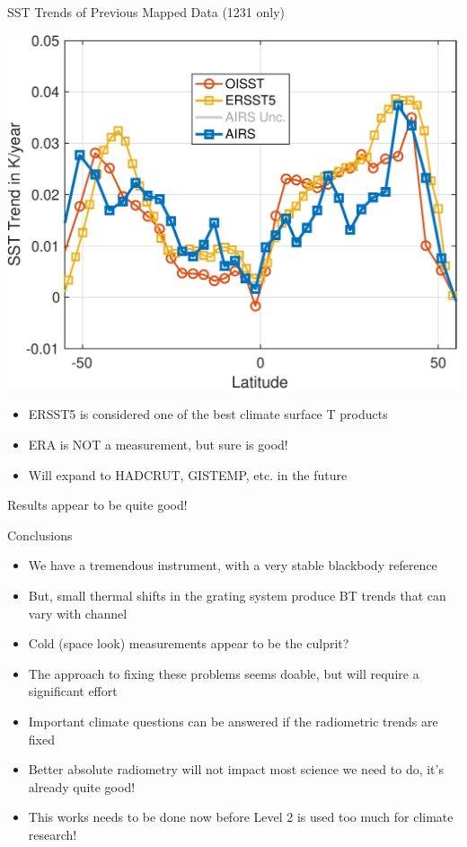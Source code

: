 \documentclass[10pt,t]{beamer}
\begin{document}
\begin{frame}[label={sec:orgf1f02b5}]{SST Trends of Previous Mapped Data (1231 \wn only)}
\begin{center}
\includegraphics[width=0.7\linewidth]{./Figs/Pdf/zonal_sst_trends_12311_vs_oisst_ersst5_hottest_per_grid_envelope.pdf}
\end{center}

\begin{footnotesize}
\begin{itemize}
\item ERSST5 is considered one of the best climate surface T products
\item ERA is NOT a measurement, but sure is good!
\item Will expand to HADCRUT, GISTEMP, etc. in the future
\end{itemize}

Results appear to be quite good! 
\end{footnotesize}
\end{frame}

\begin{frame}[label={sec:org65773c4}]{Conclusions}
\begin{itemize}
\item We have a tremendous instrument, with a very stable blackbody reference
\item But, small thermal shifts in the grating system produce BT trends that can vary with channel
\item Cold (space look) measurements appear to be the culprit?
\item The approach to fixing these problems seems doable, but will require a significant effort
\item Important climate questions can be answered if the radiometric trends are fixed
\item Better absolute radiometry will not impact most science we need to do, it's already quite good!
\item This works needs to be done now before Level 2 is used too much for climate research!
\end{itemize}
\end{frame}
\end{document}
